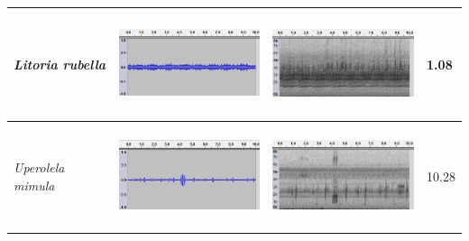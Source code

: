 \begin{table}[htb!]
{\begin{tabular}{llll}
\textit{Litoria rubella}            &    \begin{minipage}{.3\textwidth} \includegraphics[width=45mm, height=30mm]{image/Ch1/rubella_jcu_wav.png}  \end{minipage}      &   \begin{minipage}{.3\textwidth} \includegraphics[width=45mm, height=30mm]{image/Ch1/rubella_jcu_spec.png}  \end{minipage}          & 1.08     \\ \hline
\textit{Uperolela mimula}            &   \begin{minipage}{.3\textwidth} \includegraphics[width=45mm, height=30mm]{image/Ch1/mimula_jcu_wav.png}  \end{minipage}       &  \begin{minipage}{.3\textwidth} \includegraphics[width=45mm, height=30mm]{image/Ch1/mimula_jcu_spec.png}  \end{minipage}           & 10.28    \\ \hline\hline
\end{tabular}
}
\end{table}




